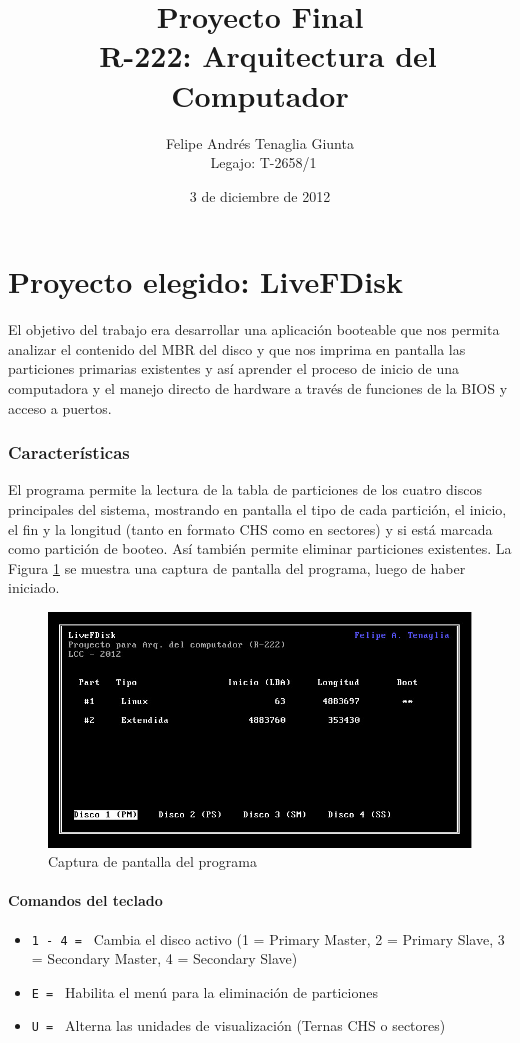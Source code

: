 \documentclass[a4paper, 11pt]{article}
\title{Proyecto Final \\\ R-222: Arquitectura del Computador}
\author{Felipe Andr\'es Tenaglia Giunta \\\ Legajo: T-2658/1}
\date{3 de diciembre de 2012}
\begin{document}
\maketitle
\newpage
\part*{Proyecto elegido: LiveFDisk}
El objetivo del trabajo era desarrollar una aplicaci\'on booteable que nos permita analizar el contenido del MBR del disco y que nos imprima en pantalla las particiones primarias existentes y as\'i aprender el proceso de inicio de una computadora y el manejo directo de hardware a trav\'es de funciones de la BIOS y acceso a puertos.

\section*{Caracter\'isticas}
El programa permite la lectura de la tabla de particiones de los cuatro discos principales del sistema, mostrando en pantalla el tipo de cada partici\'on, el inicio, el fin y la longitud (tanto en formato CHS como en sectores) y si est\'a marcada como partici\'on de booteo. As\'i tambi\'en permite eliminar particiones existentes. La Figura \ref{fig:screenshot} se muestra una captura de pantalla del programa, luego de haber iniciado.

\begin{figure}
\centering
\includegraphics[width=1\textwidth]{Screenshot.jpg}
\caption{ Captura de pantalla del programa }
\label{fig:screenshot}
\end{figure}

\subsection*{Comandos del teclado} 
\begin{itemize}
\item \verb!1 - 4 = ! Cambia el disco activo (1 = Primary Master, 2 = Primary Slave, 3 = Secondary Master, 4 = Secondary Slave)
\item \verb!E = ! Habilita el men\'u para la eliminaci\'on de particiones
\item \verb!U = ! Alterna las unidades de visualizaci\'on (Ternas CHS o sectores)
\end{itemize}
\end{document}
